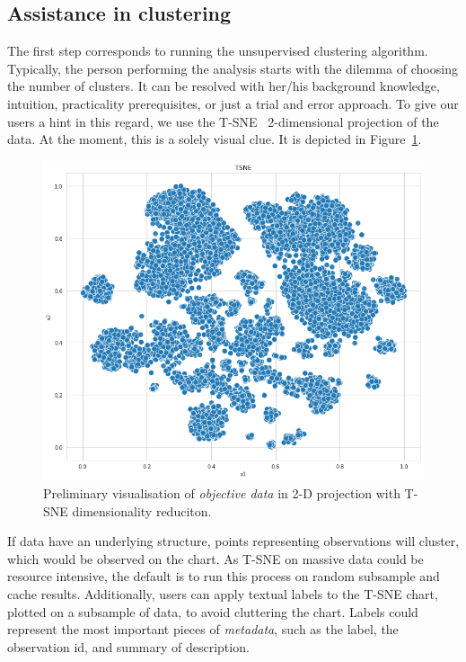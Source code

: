 \documentclass[
 twocolumn,
 hf,
]{ceurart}
\begin{document}
\subsection{Assistance in clustering}\label{subsec:assistance-in-clustering}
The first step corresponds to running the unsupervised clustering algorithm.
Typically, the person performing the analysis starts with the dilemma of choosing the number of clusters.
It can be resolved with her/his background knowledge, intuition, practicality prerequisites, or just a trial and error approach. %
To give our users a hint in this regard, we use the T-SNE~\cite{tsne} 2-dimensional projection of the data.
At the moment, this is a solely visual clue.
It is depicted in Figure~\ref{fig:tsne}.
\begin{figure}[h!]
  \centering
  \includegraphics[width=\linewidth]{example1-clustering-products-fashion-tex/output_57_1}
  \caption{Preliminary visualisation of \textit{objective data} in 2-D projection with T-SNE dimensionality reduciton.}
  \label{fig:tsne}
\end{figure}
If data have an underlying structure, points representing observations will cluster, which would be observed on the chart.
As T-SNE on massive data could be resource intensive, the default is to run this process on random subsample and cache results.
Additionally, users can apply textual labels to the T-SNE chart, plotted on a subsample of data, to avoid cluttering the chart. %
Labels could represent the most important pieces of \textit{metadata}, such as the label, the observation id, and summary of description.
\end{document}
